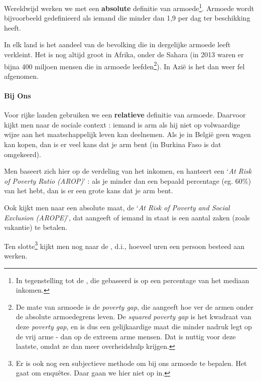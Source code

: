 Wereldwijd werken we met een \textbf{absolute} definitie van armoede\footnote{In tegenstelling tot de , die gebaseerd is op een percentage van het mediaan inkomen.}. Armoede wordt bijvoorbeeld gedefinieerd als iemand die minder dan 1,9  per dag ter beschikking heeft.
\par In elk land is het aandeel van de bevolking die in dergelijke armoede leeft verkleint. Het is nog altijd groot in Afrika, onder de Sahara (in 2013 waren er bijna 400 miljoen mensen die in armoede leefden\footnote{De mate van armoede is de \textit{poverty gap}, die aangeeft hoe ver de armen onder de absolute armoedegrens leven. De \textit{squared poverty gap} is het kwadraat van deze \textit{poverty gap}, en is dus een gelijkaardige maat die minder nadruk legt op de vrij arme - dan op de extreem arme mensen. Dat is nuttig voor deze laatste, omdat ze dan meer overheidshulp krijgen.}). In Azi\"e is het dan weer fel afgenomen.\\

\paragraph{Bij Ons}

Voor rijke landen gebruiken we een \textbf{relatieve} definitie van armoede. Daarvoor kijkt men naar de sociale context : iemand is arm als hij niet op volwaardige wijze aan het maatschappelijk leven kan deelnemen. Als je in Belgi\"e geen wagen kan kopen, dan is er veel kans dat je arm bent (in Burkina Faso is dat omgekeerd). 
\par Men baseert zich hier op de verdeling van het inkomen, en hanteert een `\textit{At Risk of Poverty Ratio (AROP)}' : als je minder dan een bepaald percentage (eg. 60\%) van het  hebt, dan is er een grote kans dat je arm bent.\\

\par Ook kijkt men naar een absolute maat, de `\textit{At Risk of Poverty and Social Exclusion (AROPE)}', dat aangeeft of iemand in staat is een aantal zaken (zoals vakantie) te betalen.\\

\par Ten slotte\footnote{Er is ook nog een subjectieve methode om bij ons armoede te bepalen. Het gaat om enqu\^{e}tes. Daar gaan we hier niet op in.} kijkt men nog naar de , d.i., hoeveel uren een persoon besteed aan werken.\\

